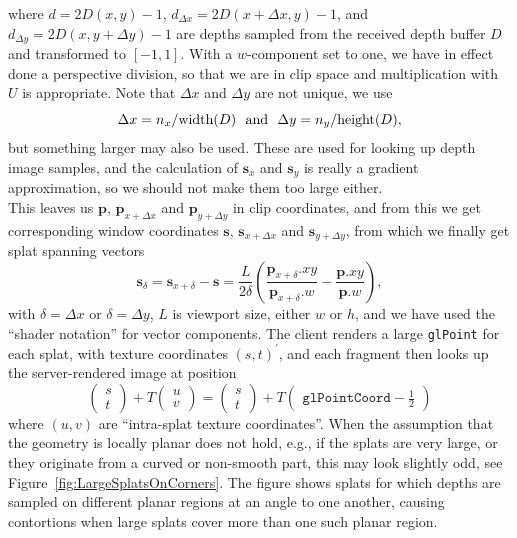 \documentclass[10pt,conference,compsocconf]{IEEEtran}
\newcommand{\pv}{\mathbf{p}}
\newcommand{\sv}{\mathbf{s}}
\newcommand{\eg}{{e.g.}}
\begin{document}
where $d = 2D(x, y) - 1$, $d_{\Delta x} =
2D(x+\Delta x, y) - 1$, and $d_{\Delta y} = 2D(x,
y+\Delta y) - 1$ are depths sampled from the received depth buffer
$D$ and transformed to $[-1, 1]$. With a
$w$-component set to one, we have in effect done a perspective division, so that
we are in clip space and multiplication with $U$ is appropriate.
%
Note that $\Delta x$ and $\Delta y$ are not unique, we use
\[
  \Delta x = n_x / \text{width}(D) \text{\,\,\,\,and\,\,\,\,}
  \Delta y = n_y / \text{height}(D),
\]
but something larger may also be used. These are used for looking up depth image
samples, and the calculation of $\sv_x$ and $\sv_y$ is really a gradient
approximation, so we should not make them too large either.
\\
This leaves us $\pv$, $\pv_{x+\Delta x}$ and $\pv_{y+\Delta y}$ in clip
coordinates, and from this we get
corresponding window coordinates $\sv$, $\sv_{x+\Delta x}$ and $\sv_{y+\Delta
y}$, from which we finally get splat spanning vectors
\[
  \sv_{\delta} =
  \sv_{x+\delta} - \sv =
    \frac{L}{2\delta} \left(
        \frac{\pv_{x+\delta}.xy}{\pv_{x+\delta}.w} -
        \frac{\pv.xy}{\pv.w}
    \right),
\]
with $\delta=\Delta x$ or $\delta=\Delta y$, $L$ is viewport size, either $w$ or
$h$, and we have used the ``shader notation'' for vector components.  The client
renders a large \texttt{glPoint} for each splat, with texture coordinates $(s,
t)^\prime$, and each fragment then looks up the server-rendered image at
position
\[
  \begin{pmatrix}
    s \\ t
  \end{pmatrix} +
  T 
  \begin{pmatrix}
    u \\ v
  \end{pmatrix}
  =
  \begin{pmatrix}
    s \\ t
  \end{pmatrix} +
  T 
  \begin{pmatrix}
    \texttt{glPointCoord}-\frac{1}{2}
  \end{pmatrix}
\]
where $(u, v)$ are ``intra-splat texture coordinates''.  When the assumption
that the geometry is locally planar does not hold, \eg, if the splats are very
large, or they originate from a curved or non-smooth part, this may look
slightly odd, see Figure~\ref{fig:LargeSplatsOnCorners}. The figure shows splats
for which depths are sampled on different planar regions at an angle to one
another, causing contortions when large splats cover more than one such planar
region.
\end{document}
